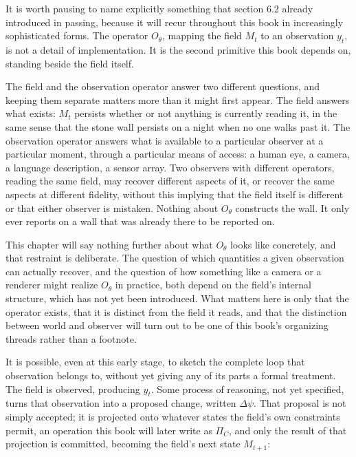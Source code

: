 It is worth pausing to name explicitly something that section 6.2 already introduced in passing, because it will recur throughout this book in increasingly sophisticated forms. The operator \(O_\theta\), mapping the field \(M_t\) to an observation \(y_t\), is not a detail of implementation. It is the second primitive this book depends on, standing beside the field itself.

The field and the observation operator answer two different questions, and keeping them separate matters more than it might first appear. The field answers what exists: \(M_t\) persists whether or not anything is currently reading it, in the same sense that the stone wall persists on a night when no one walks past it. The observation operator answers what is available to a particular observer at a particular moment, through a particular means of access: a human eye, a camera, a language description, a sensor array. Two observers with different operators, reading the same field, may recover different aspects of it, or recover the same aspects at different fidelity, without this implying that the field itself is different or that either observer is mistaken. Nothing about \(O_\theta\) constructs the wall. It only ever reports on a wall that was already there to be reported on.

This chapter will say nothing further about what \(O_\theta\) looks like concretely, and that restraint is deliberate. The question of which quantities a given observation can actually recover, and the question of how something like a camera or a renderer might realize \(O_\theta\) in practice, both depend on the field's internal structure, which has not yet been introduced. What matters here is only that the operator exists, that it is distinct from the field it reads, and that the distinction between world and observer will turn out to be one of this book's organizing threads rather than a footnote.

It is possible, even at this early stage, to sketch the complete loop that observation belongs to, without yet giving any of its parts a formal treatment. The field is observed, producing \(y_t\). Some process of reasoning, not yet specified, turns that observation into a proposed change, written \(\Delta\psi\). That proposal is not simply accepted; it is projected onto whatever states the field's own constraints permit, an operation this book will later write as \(\Pi_C\), and only the result of that projection is committed, becoming the field's next state \(M_{t+1}\):

